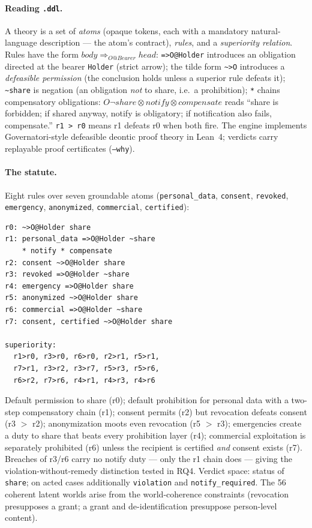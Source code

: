 \paragraph{Reading \texttt{.ddl}.} A theory is a set of \emph{atoms} (opaque
tokens, each with a mandatory natural-language description --- the atom's
contract), \emph{rules}, and a \emph{superiority relation}. Rules have the
form $body \Rightarrow_{O@Bearer} head$: \texttt{=>O@Holder} introduces an
obligation directed at the bearer \texttt{Holder} (strict arrow); the tilde
form \texttt{\textasciitilde>O} introduces a \emph{defeasible permission}
(the conclusion holds unless a superior rule defeats it); \texttt{\~{}share}
is negation (an obligation \emph{not} to share, i.e.\ a prohibition);
\texttt{*} chains compensatory obligations: $O\neg share \otimes notify
\otimes compensate$ reads ``share is forbidden; if shared anyway, notify is
obligatory; if notification also fails, compensate.'' \texttt{r1 > r0} means
r1 defeats r0 when both fire. The engine implements
Governatori-style defeasible deontic proof theory
\citep{governatori2018practical,governatori2024oddity} in Lean~4; verdicts
carry replayable proof certificates (\texttt{--why}).

\paragraph{The statute.} Eight rules over seven groundable atoms
(\texttt{personal\_data}, \texttt{consent}, \texttt{revoked},
\texttt{emergency}, \texttt{anonymized}, \texttt{commercial},
\texttt{certified}):

\begin{lstlisting}
r0: ~>O@Holder share
r1: personal_data =>O@Holder ~share
    * notify * compensate
r2: consent ~>O@Holder share
r3: revoked =>O@Holder ~share
r4: emergency =>O@Holder share
r5: anonymized ~>O@Holder share
r6: commercial =>O@Holder ~share
r7: consent, certified ~>O@Holder share

superiority:
  r1>r0, r3>r0, r6>r0, r2>r1, r5>r1,
  r7>r1, r3>r2, r3>r7, r5>r3, r5>r6,
  r6>r2, r7>r6, r4>r1, r4>r3, r4>r6
\end{lstlisting}

Default permission to share (r0); default prohibition for personal data with
a two-step compensatory chain (r1); consent permits (r2) but revocation
defeats consent (r3 $>$ r2); anonymization moots even revocation (r5 $>$ r3);
emergencies create a duty to share that beats every prohibition layer (r4);
commercial exploitation is separately prohibited (r6) unless the recipient is
certified \emph{and} consent exists (r7). Breaches of r3/r6 carry no notify
duty --- only the r1 chain does --- giving the
violation-without-remedy distinction tested in RQ4. Verdict space: status of
\texttt{share}; on acted cases additionally \texttt{violation} and
\texttt{notify\_required}. The 56 coherent latent worlds arise from the
world-coherence constraints (revocation presupposes a grant; a grant and
de-identification presuppose person-level content).

